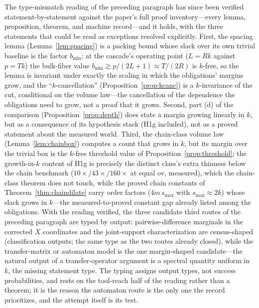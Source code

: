 The type-mismatch reading of the preceding paragraph has since been
verified statement-by-statement against the paper's full proof
inventory---every lemma, proposition, theorem, and machine record---and
it holds, with the three statements that could be read as exceptions
resolved explicitly. First, the spacing lemma (Lemma~\ref{lem:spacing})
is a packing bound whose slack over its own trivial baseline is the
factor $b_{\min}$; at the cascade's operating point ($L=Rk$ against
$p=Tk$) the bulk-fiber value $b_{\min}\gtrsim p/(2L+1)\approx T/(2R)$ is
$k$-free, so the lemma is invariant under exactly the scaling in which
the obligations' margins grow, and the ``$k$-cancellation''
(Proposition~\ref{prop:kcanc}) is a $k$-invariance of the cut,
conditional on the volume law---the cancellation of the dependence the
obligations need to grow, not a proof that it grows. Second, part (d) of
the comparison (Proposition~\ref{prop:depth}) does state a margin
growing linearly in $k$, but as a consequence of its hypothesis stack
(H1g included), not as a proved statement about the measured world.
Third, the chain-class volume law (Lemma~\ref{lem:chainbox}) computes a
count that grows in $k$, but its margin over the trivial box is the
$k$-free threshold value of Proposition~\ref{prop:threshold}; the
growth-in-$k$ content of H1g is precisely the distinct class's extra
thinness below the chain benchmark ($10\times/43\times/160\times$ at
equal $\mathrm{ov}$, measured), which the chain-class theorem does not
touch, while the proved chain constants of Theorem~\ref{thm:chaindilate}
carry order factors ($4m\,s_{\max}$ with $s_{\max}\approx2k$) whose
slack grows in $k$---the measured-to-proved constant gap already listed
among the obligations. With the reading verified, the three candidate
third routes of the preceding paragraph are typed by output:
pairwise-difference marginals in the corrected $X$ coordinates and the
joint-support characterization are census-shaped (classification
outputs; the same type as the two routes already closed), while the
transfer-matrix or automaton model is the one margin-shaped
candidate---the natural output of a transfer-operator argument is a
spectral quantity uniform in $k$, the missing statement type. The typing
assigns output types, not success probabilities, and rests on the
tool-reach half of the reading rather than a theorem; it is the reason
the automaton route is the only one the record prioritizes, and the
attempt itself is its test.

